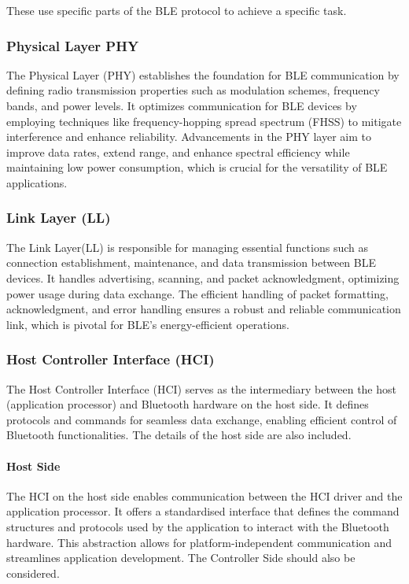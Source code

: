 These use specific parts of the BLE protocol to achieve a specific task.

\subsubsection{Physical Layer PHY}
The Physical Layer (PHY) establishes the foundation for BLE communication by defining radio transmission properties such as modulation schemes, frequency bands, and power levels. It optimizes communication for BLE devices by employing techniques like frequency-hopping spread spectrum (FHSS) to mitigate interference and enhance reliability. Advancements in the PHY layer aim to improve data rates, extend range, and enhance spectral efficiency while maintaining low power consumption, which is crucial for the versatility of BLE applications.

\subsubsection{Link Layer (LL)}
The Link Layer(LL)
is responsible for managing essential functions such as connection establishment, maintenance, and data transmission between BLE devices. It handles advertising, scanning, and packet acknowledgment, optimizing power usage during data exchange. The efficient handling of packet formatting, acknowledgment, and error handling ensures a robust and reliable communication link, which is pivotal for BLE's energy-efficient operations.

\subsubsection{Host Controller Interface (HCI)}
The Host Controller Interface (HCI)
serves as the intermediary between the host (application processor) and Bluetooth hardware on the host side. It defines protocols and commands for seamless data exchange, enabling efficient control of Bluetooth functionalities.
The details of the host side are also included.

\paragraph{Host Side}
The HCI on the host side enables communication between the HCI driver and the application processor. It offers a standardised interface that defines the command structures and protocols used by the application to interact with the Bluetooth hardware. This abstraction allows for platform-independent communication and streamlines application development.
The Controller Side should also be considered.

